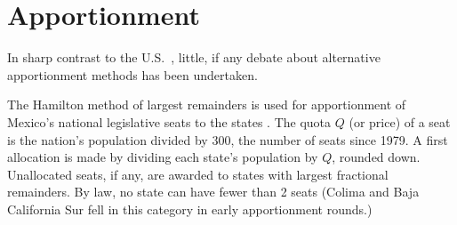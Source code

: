\documentclass[letter,12pt]{article}
\begin{document}
\section{Apportionment}

In sharp contrast to the U.S.\ \citep{szpiro.numbersRule.2010}, little, if any debate about alternative apportionment methods has been undertaken. 

The Hamilton method of largest remainders is used for apportionment of Mexico's national legislative seats to the states \citep[][:10]{balinskiYoung2001FairRep}. The quota $Q$ (or price) of a seat is the nation's population divided by 300, the number of seats since 1979. A first allocation is made by dividing each state's population by $Q$, rounded down. Unallocated seats, if any, are awarded to states with largest fractional remainders. By law, no state can have fewer than 2 seats (Colima and Baja California Sur fell in this category in early apportionment rounds.) 
\end{document}
